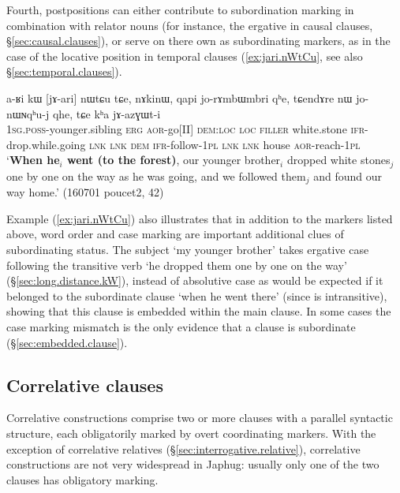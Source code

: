 Fourth, postpositions can either contribute to subordination marking in combination with relator nouns (for instance, the ergative in causal clauses, §\ref{sec:causal.clauses}), or serve on there own as subordinating markers, as in the case of the locative position in temporal clauses (\ref{ex:jari.nWtCu}, see also §\ref{sec:temporal.clauses}).

 \begin{exe}
\ex \label{ex:jari.nWtCu}
\gll a-ʁi kɯ [jɤ-ari] nɯtɕu tɕe, nɤkinɯ, qapi jo-rɤmbɯmbri qʰe, tɕendɤre nɯ jo-nɯɴqʰu-j qhe, tɕe kʰa jɤ-azɣɯt-i \\
\textsc{1sg}.\textsc{poss}-younger.sibling \textsc{erg} \textsc{aor}-go[II] \textsc{dem}:\textsc{loc} \textsc{loc} \textsc{filler} white.stone \textsc{ifr}-drop.while.going \textsc{lnk} \textsc{lnk} \textsc{dem} \textsc{ifr}-follow-\textsc{1pl} \textsc{lnk} \textsc{lnk} house \textsc{aor}-reach-\textsc{1pl} \\
\glt `\textbf{When he$_i$ went (to the forest)}, our younger brother$_i$ dropped white stones$_j$ one by one on the way as he was going, and we followed them$_j$ and found our way home.' (160701 poucet2, 42)
\end{exe}

Example (\ref{ex:jari.nWtCu}) also illustrates that in addition to the markers listed above, word order and case marking are important additional clues of subordinating status. The subject  `my younger brother' takes ergative case following the transitive verb  `he dropped them one by one on the way' (§\ref{sec:long.distance.kW}), instead of absolutive case as would be expected if it belonged to the subordinate clause  `when he went there' (since  is intransitive), showing that this clause is embedded within the main clause. In some cases the case marking mismatch is the only evidence that a clause is subordinate (§\ref{sec:embedded.clause}).

\subsection{Correlative clauses}  \label{sec:correlative.clauses}
Correlative constructions comprise two or more clauses with a parallel syntactic structure, each obligatorily marked by overt coordinating markers. With the exception of correlative relatives (§\ref{sec:interrogative.relative}), correlative constructions are not very widespread in Japhug: usually only one of the two clauses has obligatory marking.

